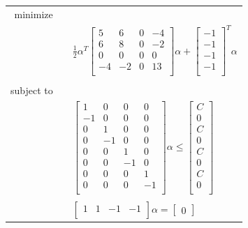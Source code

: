 \documentclass{sigchi}
\begin{document}
\normalsize
\begin{center}\begin{tabular}{r p{0.0in} l }
minimize &&\\
&&
$ \displaystyle \frac{1}{2}\alpha^T
\begin{bmatrix}
5 & 6 & 0 & -4\\
6 & 8 & 0 & -2\\
0 & 0 & 0 & 0\\
-4 & -2 & 0 & 13\\
\end{bmatrix}
\alpha +
\begin{bmatrix}
-1\\ -1\\ -1\\ -1\\
\end{bmatrix}^T
\alpha
 $
\\ && \\
subject to &&\\
&& $
\begin{bmatrix}
1 & 0 & 0 & 0\\
-1 & 0 & 0 & 0\\
0 & 1 & 0 & 0\\
0 & -1 & 0 & 0\\
0 & 0 & 1 & 0\\
0 & 0 & -1 & 0\\
0 & 0 & 0 & 1\\
0 & 0 & 0 & -1\\
\end{bmatrix}
\alpha
\leq
\begin{bmatrix}
C\\
0\\
C\\
0\\
C\\
0\\
C\\
0\\
\end{bmatrix}
$ 
\\ && \\
&&		      $ 
\begin{bmatrix}
1& 1& -1& -1\\
\end{bmatrix}
\alpha = \begin{bmatrix}0\end{bmatrix}
$
\end{tabular}\end{center}
\end{document}
